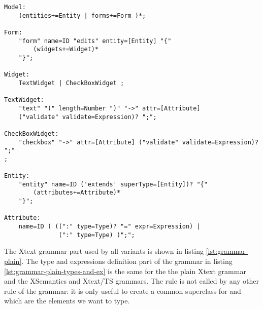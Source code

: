 %

\begin{lstlisting}[language=xtext,label=lst:grammar-plain,caption=Grammar with plain Xtext.] 
Model:
	(entities+=Entity | forms+=Form )*;

Form:
	"form" name=ID "edits" entity=[Entity] "{"	
		(widgets+=Widget)*
	"}";

Widget:
	TextWidget | CheckBoxWidget ;

TextWidget:
	"text" "(" length=Number ")" "->" attr=[Attribute] 
	("validate" validate=Expression)? ";";

CheckBoxWidget:
	"checkbox" "->" attr=[Attribute] ("validate" validate=Expression)? ";"
;

Entity:
	"entity" name=ID ('extends' superType=[Entity])? "{"
		(attributes+=Attribute)*
	"}";

Attribute:
	name=ID ( ((":" type=Type)? "=" expr=Expression) | 
               (":" type=Type) )";";
\end{lstlisting}

The Xtext grammar part used by all variants is shown in listing
\ref{lst:grammar-plain}. The type and expressions definition part of the grammar
in listing \ref{lst:grammar-plain-types-and-ex} is the same for the the plain
Xtext grammar and the XSemantics and Xtext/TS grammars. 
The rule  is not called by any other rule of the grammar: it is
only useful to create a common superclass for  and
 which are the elements we want to type.

